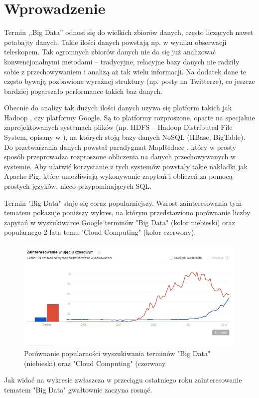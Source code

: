 \section{Wprowadzenie}
\label{sec:Wprowadzenie}

Termin ,,Big Data'' odnosi się do wielkich zbiorów danych, często liczących nawet petabajty danych. Takie ilości danych powstają np. w wyniku obserwacji teleskopem. Tak ogromnych zbiorów danych nie da się już analizować konwencjonalnymi metodami -- tradycyjne, relacyjne bazy danych nie radziły sobie z przechowywaniem i analizą aż tak wielu informacji. Na dodatek dane te często bywają pozbawione wyraźnej struktury (np. posty na Twitterze), co jeszcze bardziej pogarszało performance takich baz danych.

Obecnie do analizy tak dużych ilości danych uzywa się platform takich jak Hadoop \cite{apache:hadoop}, czy platformy Google. Są to platformy rozproszone, oparte na specjalnie zaprojektowanych systemach plików (np. HDFS -- Hadoop Distributed File System, opisany w \cite{shvachko10}), na których stoją bazy danych NoSQL (HBase, BigTable). Do przetwarzania danych powstał paradygmat MapReduce \cite{dean08}, który w prosty sposób przeprowadza rozproszone obliczenia na danych przechowywanych w systemie. Aby ułatwić korzystanie z tych systemów powstały takie nakładki jak Apache Pig, które umożliwiają wykonywanie zapytań i obliczeń za pomocą prostych języków, nieco przypominających SQL.

Termin "Big Data" staje się coraz popularniejszy. Wzrost zainteresowania tym tematem pokazuje poniższy wykres, na którym przedstawiono porównanie liczby zapytań w wyszukiwarce Google terminów "Big Data" (kolor niebieski) oraz popularnego 2 lata temu "Cloud Computing" (kolor czerwony).

\begin{figure}[h]
\centerline{\includegraphics[scale=2.5]{obrazki/trend-big-data_cloud-computing.png}}
\caption{Porównanie popularności wyszukiwania terminów "Big Data" (niebieski) oraz "Cloud Computing" (czerwony}
\label{fig:big_data_popularnosc}
\end{figure}

Jak widać na wykresie zwłaszcza w przeciągu ostatniego roku zainteresowanie tematem "Big Data" gwałtownie zaczyna rosnąć.


